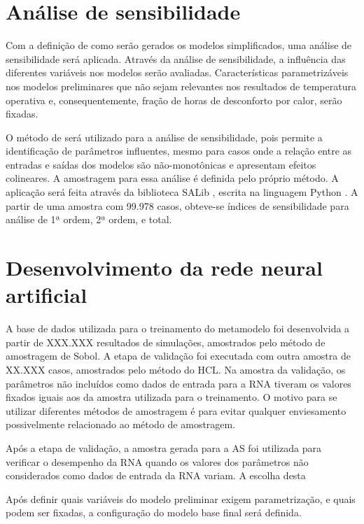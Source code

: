 \documentclass[brazil,hardcopy,openany,a5paper]{ufscthesis}
\begin{document}
		\section{Análise de sensibilidade}
		
		Com a definição de como serão gerados os modelos simplificados, uma análise de sensibilidade será aplicada. Através da análise de sensibilidade, a influência das diferentes variáveis nos modelos serão avaliadas. Características parametrizáveis nos modelos preliminares que não sejam relevantes nos resultados de temperatura operativa e, consequentemente, fração de horas de desconforto por calor, serão fixadas.
		
		O método de  \cite{Sobol1993} será utilizado para a análise de sensibilidade, pois permite a identificação de parâmetros influentes, mesmo para casos onde a relação entre as entradas e saídas dos modelos são não-monotônicas  e apresentam efeitos colineares. A amostragem para essa análise é definida pelo próprio método. A aplicação será feita através da biblioteca SALib \cite{Herman2017}, escrita na linguagem Python \cite{Python}. A partir de uma amostra com 99.978 casos, obteve-se índices de sensibilidade para análise de 1ª ordem, 2ª ordem, e total.
		
		\section{Desenvolvimento da rede neural artificial}
		
		A base de dados utilizada para o treinamento do metamodelo foi desenvolvida a partir de XXX.XXX resultados de simulações, amostrados pelo método de amostragem de Sobol. A etapa de validação foi executada com outra amostra de XX.XXX casos, amostrados pelo método do HCL. Na amostra da validação, os parâmetros não incluídos como dados de entrada para a RNA tiveram os valores fixados iguais aos da amostra utilizada para o treinamento. O motivo para se utilizar diferentes métodos de amostragem é para evitar qualquer enviesamento possivelmente relacionado ao método de amostragem.
		
		Após a etapa de validação, a amostra gerada para a AS foi utilizada para verificar o desempenho da RNA quando os valores dos parâmetros não considerados como dados de entrada da RNA variam. A escolha desta 
		
		Após definir quais variáveis do modelo preliminar exigem parametrização, e quais podem ser fixadas, a configuração do modelo base final será definida.
		
\end{document}
